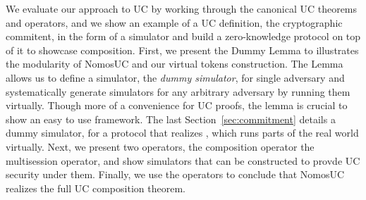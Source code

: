 We evaluate our approach to UC by working through the canonical UC theorems and operators, and we show an example of a UC definition,
the cryptographic commitent, in the form of a simulator and build a zero-knowledge protocol on top of it to showcase composition.
First, we present the Dummy Lemma to illustrates the modularity of NomosUC and our virtual tokens construction.
The Lemma allows us to define a simulator, the \emph{dummy simulator}, for single adversary and systematically generate simulators for any arbitrary adversary
by running them virtually. Though more of a convenience for UC proofs, the lemma is crucial to show an easy to use framework.
The last Section~\ref{sec:commitment} details a dummy simulator, for a protocol that realizes \Fcom, which runs parts of the real world virtually. 
Next, we present two operators, the composition operator the multisession operator, and show simulators that can be constructed to provde UC security under them.
Finally, we use the operators to conclude that NomosUC realizes the full UC composition theorem.

